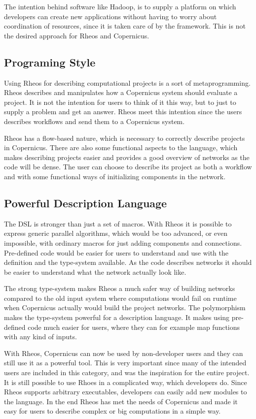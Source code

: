 The intention behind software like Hadoop, is to supply a platform on
which developers can create new applications without having to worry
about coordination of resources, since it is taken care of by the
framework. This is not the desired approach for Rheos and Copernicus.

\subsection{Programing Style}
Using Rheos for describing computational projects is a sort of
metaprogramming. Rheos describes and manipulates how a Copernicus
system should evaluate a project. It is not the intention for users
to think of it this way, but to just to supply a problem and get an
answer. Rheos meet this intention since the users describes workflows
and send them to a Copernicus system.

Rheos has a flow-based nature, which is necessary to correctly
describe projects in Copernicus. There are also some functional
aspects to the language, which makes describing projects easier and
provides a good overview of networks as the code will be dense. The
user can choose to describe its project as both a workflow and with
some functional ways of initializing components in the network.


\subsection{Powerful Description Language}
The DSL is stronger than just a set of macros. With Rheos it is
possible to express generic parallel algorithms, which would be too
advanced, or even impossible, with ordinary macros for just adding
components and connections. Pre-defined code would be easier for users
to understand and use with the definition and the type-system
available. As the code describes networks it should be easier to
understand what the network actually look like.

The strong type-system makes Rheos a much safer way of building
networks compared to the old input system where computations would
fail on runtime when Copernicus actually would build the project
networks. The polymorphism makes the type-system powerful for a
description language. It makes using pre-defined code much easier for
users, where they can for example map functions with any kind of
inputs.

With Rheos, Copernicus can now be used by non-developer users and they
can still use it as a powerful tool. This is very important since many
of the intended users are included in this category, and was the
inspiration for the entire project. It is still possible to use Rhoes
in a complicated way, which developers do. Since Rheos supports
arbitrary executables, developers can easily add new modules to the
language. In the end Rheos has met the needs of Copernicus and made it
easy for users to describe complex or big computations in a simple
way.

